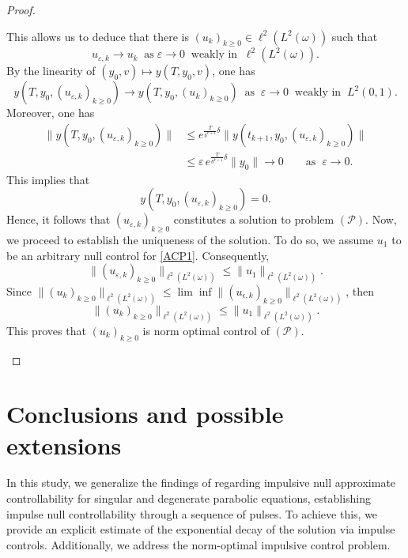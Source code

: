 \documentclass[sn-mathphys]{sn-jnl}
\begin{document}
\begin{proof}
\begin{enumerate}
\begin{equation}
   \end{equation}
   This allows us to deduce that there is $(u_k)_{k \geq 0} \in \ell^2(L^2(\omega))$ such that 
   \[u_{\varepsilon,k} \to u_k \;\;\text{as}\;\varepsilon \to 0 \;\;\text{weakly in}\;\;\ell^2(L^2(\omega)).\]
   By the linearity of $(y_0,v) \mapsto y(T, y_0, v)$, one has
   \begin{equation*}
       y(T,y_0,(u_{\varepsilon,k})_{k \geq 0}) \to y(T,y_0,(u_k)_{k \geq 0}) \;\;\text{as}\;\;\varepsilon\to 0\;\;\text{weakly in}\;\;L^2(0,1).
   \end{equation*}
   Moreover, one has
   \begin{align*}
       \| y(T,y_0,(u_{\varepsilon,k})_{k \geq 0})\|
       &\leq e^{\frac{T}{b^{k+1}}\delta} \| y(t_{k+1},y_0,(u_{\varepsilon,k})_{k \geq 0})\| \\
       &\leq \varepsilon \, e^{\frac{T}{b^{k+1}}\delta}\|y_0\| \to 0 \qquad\text{as}\;\;\varepsilon\to 0.
   \end{align*}
   This implies that 
   \[y(T,y_0,(u_{\varepsilon,k})_{k \geq 0})=0.\]
    Hence, it follows that \( (u_{\varepsilon,k})_{k \geq 0} \) constitutes a solution to problem \( (\mathcal{P}) \). Now, we proceed to establish the uniqueness of the solution. To do so, we assume \( u_1 \) to be an arbitrary null control for \eqref{ACP1}. Consequently,
    \begin{equation*}
       \| (u_{\varepsilon,k})_{k \geq 0} \|_{\ell^2(L^2(\omega))}\leq \| u_1\|_{\ell^2(L^2(\omega))}.
    \end{equation*}
    Since $\| (u_k)_{k \geq 0}\|_{\ell^2(L^2(\omega))} \leq \lim \inf \|(u_{\epsilon,k})_{k \geq 0}\|_{\ell^2(L^2(\omega))}$, then
   \begin{equation*}
       \| (u_k)_{k \geq 0}\|_{\ell^2(L^2(\omega))} \leq \|u_1\|_{\ell^2(L^2(\omega))}.
   \end{equation*}
   This proves that $(u_k)_{k \geq 0}$ is norm optimal control of $(\mathcal{P})$.
\end{enumerate}
\end{proof}

\section{Conclusions and possible extensions}
In this study, we generalize the findings of \citep{MMOS} regarding impulsive null approximate controllability for singular and degenerate parabolic equations, establishing impulse null controllability through a sequence of pulses. To achieve this, we provide an explicit estimate of the exponential decay of the solution via impulse controls. Additionally, we address the norm-optimal impulsive control problem.
\end{document}
